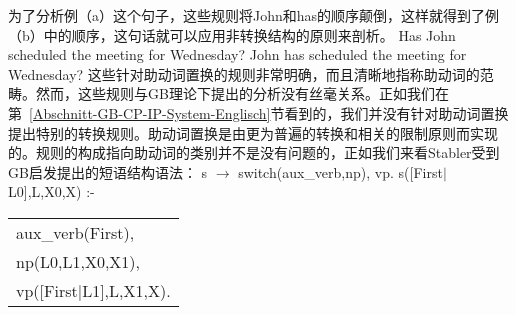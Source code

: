 为了分析例（a）这个句子，这些规则将John和has的顺序颠倒，这样就得到了例（b）中的顺序，这句话就可以应用非转换结构的原则来剖析。
\eal
\ex Has John scheduled the meeting for Wednesday?
\ex John has scheduled the meeting for Wednesday?
\zl
这些针对助动词置换的规则非常明确，而且清晰地指称助动词的范畴。然而，这些规则与GB理论下提出的分析没有丝毫关系。正如我们在第~\ref{Abschnitt-GB-CP-IP-System-Englisch}节看到的，我们并没有针对助动词置换提出特别的转换规则。助动词置换是由更为普遍的转换\movealpha 和相关的限制原则而实现的。规则的构成指向助动词的类别并不是没有问题的，正如我们来看Stabler受到GB启发提出的短语结构语法：
\eal
\ex\label{Regel-Aux-inv-Stabler} s $\to$ switch(aux\_verb,np), vp.
\ex s([First$|$L0],L,X0,X) :- \begin{tabular}[t]{@{}l@{}}
                              aux\_verb(First),\\
                              np(L0,L1,X0,X1),\\
                              vp([First$|$L1],L,X1,X).\\
                              \end{tabular}

